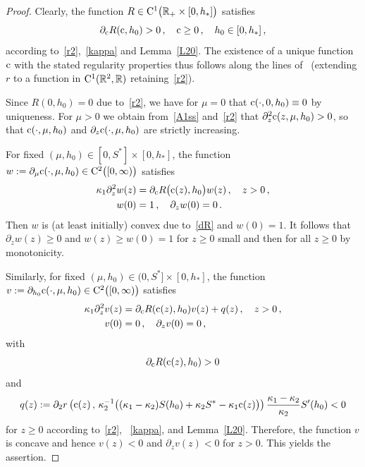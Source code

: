 \documentclass[reqno,11pt]{amsart}
\numberwithin{equation}{section}
\newcommand{\R}{\mathbb{R}}
\begin{document}
\begin{proof}
 Clearly, the function $R\in {\rm C}^1\big(\R_+\times [0,h_*]\big)$ satisfies
\begin{equation}\label{dR}
\partial_{\rm c}R({\rm c},h_0)>0\,,\quad {\rm c}\ge 0\,,\quad h_0\in[0,h_*]\,,
\end{equation}
according to~\eqref{r2},~\eqref{kappa} and Lemma~\ref{L20}. The existence of a unique function ${\rm c}$ with the stated regularity properties thus follows along the lines of~\cite[Lemma~3.7]{GW_QAM} (extending $r$ to a function in ${\rm C}^1(\R^2,\R)$ retaining~\eqref{r2}). 

Since $R(0,h_0)=0$ due to~\eqref{r2}, we have for $\mu=0$ that ${\rm c}(\cdot,0,h_0)\equiv 0$ by uniqueness. For $\mu>0$ we obtain from~\eqref{A1ss} and~\eqref{r2} that $\partial_z^2{\rm c}(z,\mu,h_0)>0$, so that ${\rm c}(\cdot,\mu,h_0)$ and $\partial_z{\rm c}(\cdot,\mu,h_0)$ are strictly increasing.

For fixed $(\mu,h_0)\in [0,S^*]\times [0,h_*]$, the function
$w:=\partial_\mu {\rm c}(\cdot,\mu,h_0)\in{\rm C}^2\bigl([0,\infty)\bigr)$
satisfies
\begin{subequations}
\begin{align}
\kappa_1\partial_z^2 w(z)&=\partial_{\rm c} R\big({\rm c}(z),h_0\big)w(z)\,, \quad z>0\,, \label{w1}\\
w(0)&=1\,,\quad \partial_z w(0)=0\,. 
\end{align}
\end{subequations}
Then $w$ is (at least initially) convex due to~\eqref{dR} and $w(0)=1$. It follows that $\partial_zw(z)\geq 0$ and
\mbox{$w(z)\ge w(0)=1$} for $z\geq 0$ small and then for all $z\geq 0$ by
monotonicity. 

Similarly, for fixed $(\mu,h_0)\in (0,S^*]\times [0,h_*]$, the function
$v:=\partial_{h_0} {\rm c}(\cdot,\mu,h_0)\in{\rm C}^2\bigl([0,\infty)\bigr)$
satisfies
\begin{subequations}
\begin{align}
\kappa_1\partial_z^2 v(z)&=\partial_{\rm c} R({\rm c}(z),h_0)v(z)+q(z)\,, \quad z>0\,,\label{v1} \\
v(0)&=0\,,\quad \partial_z v(0)=0\,,\label{v2}
\end{align}
\end{subequations}
with
\begin{align*}
\partial_{\rm c} R({\rm c}(z),h_0)> 0
\end{align*}
and
\begin{align*}
 q(z):=\partial_2 r\left({\rm c}(z)\,,\,\kappa_2^{-1}\big((\kappa_1-\kappa_2) S(h_0)+\kappa_2 S^*-\kappa_1 {\rm c}(z)\big)\right)\frac{\kappa_1-\kappa_2}{\kappa_2}S'(h_0)<0
\end{align*}
for $z\ge 0$ according to~\eqref{r2}, ~\eqref{kappa}, and Lemma~\ref{L20}. Therefore, the function $v$ is concave	and hence $v(z)<0$ and $\partial_zv(z)<0$ for $z> 0$. This yields the assertion.
\end{proof}
\end{document}
